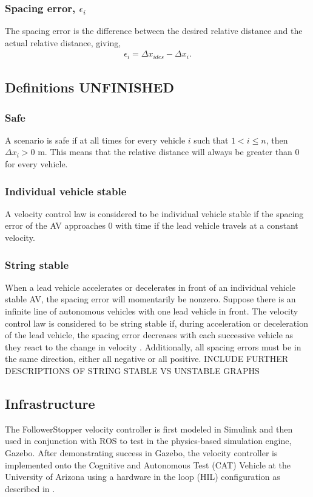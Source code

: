 \documentclass[conference]{IEEEtran}
\begin{document}
\subsubsection{Spacing error, $\epsilon_i$}
The spacing error is the difference between the desired relative distance and the actual relative distance, giving,
\begin{eqnarray}
\epsilon_i = \Delta x_{i des}-\Delta x_i.
\end{eqnarray}

\subsection{Definitions UNFINISHED}
\subsubsection{Safe}
A scenario is safe if at all times for every vehicle $i$ such that $1<i\leq n$, then $\Delta x_i>0$ m. This means that the relative distance will always be greater than 0 for every vehicle.
\subsubsection{Individual vehicle stable}
A velocity control law is considered to be individual vehicle stable if the spacing error of the AV approaches 0 with time if the lead vehicle travels at a constant velocity.
\subsubsection{String stable}
When a lead vehicle accelerates or decelerates in front of an individual vehicle stable AV, the spacing error will momentarily be nonzero. Suppose there is an infinite line of autonomous vehicles with one lead vehicle in front. The velocity control law is considered to be string stable if, during acceleration or deceleration of the lead vehicle, the spacing error decreases with each successive vehicle as they react to the change in velocity \cite{rajamani2011vehicle}. Additionally, all spacing errors must be in the same direction, either all negative or all positive. INCLUDE FURTHER DESCRIPTIONS OF STRING STABLE VS UNSTABLE GRAPHS

\subsection{Infrastructure}
The FollowerStopper velocity controller is first modeled in Simulink and then used in conjunction with ROS to test in the physics-based simulation engine, Gazebo. After demonstrating success in Gazebo, the velocity controller is implemented onto the Cognitive and Autonomous Test (CAT) Vehicle at the University of Arizona using a hardware in the loop (HIL) configuration as described in \cite{bhadani2018cat}.
\end{document}
